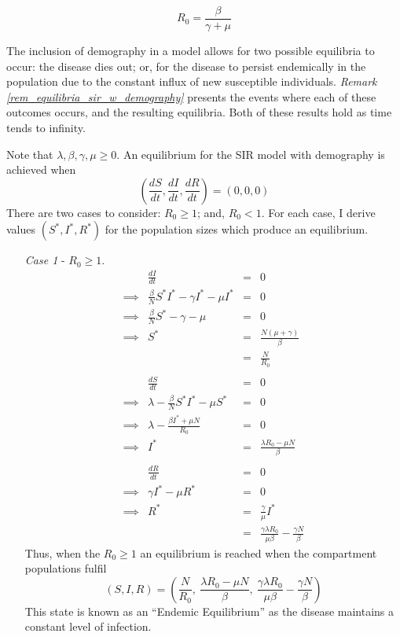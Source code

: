 \documentclass[11pt,a4paper]{article}
\theoremstyle{break}
\begin{document}
  \begin{equation}\label{eqn_r0_sir_w_demographics}
    R_0=\frac{\beta}{\gamma+\mu}
  \end{equation}

  \par The inclusion of demography in a model allows for two possible equilibria to occur: the disease dies out; or, for the disease to persist endemically in the population due to the constant influx of new susceptible individuals. \textit{Remark \ref{rem_equilibria_sir_w_demography}} presents the events where each of these outcomes occurs, and the resulting equilibria. Both of these results hold as time tends to infinity.

  \begin{box_remark}\label{rem_equilibria_sir_w_demography}
    Note that $\lambda,\beta,\gamma,\mu\geq0$. An equilibrium for the SIR model with demography is achieved when
    \[ \left(\frac{dS}{dt},\frac{dI}{dt},\frac{dR}{dt}\right)=(0,0,0) \]
    There are two cases to consider: $R_0\geq 1$; and, $R_0<1$. For each case, I derive values $(S^*,I^*,R^*)$ for the population sizes which produce an equilibrium.
    \begin{itemize}
      \item[\textit{Case 1}] - $R_0\geq1$.
      \[\begin{array}{rrcl}
        &\frac{dI}{dt}&=&0\\
        \implies&\frac{\beta}N S^*I^*-\gamma I^*-\mu I^*&=&0\\
        \implies&\frac{\beta}N S^*-\gamma-\mu&=&0\\
        \implies&S^*&=&\frac{N(\mu+\gamma)}\beta\\
        &&=&\frac{N}{R_0}\\
        \\
        &\frac{dS}{dt}&=&0\\
        \implies&\lambda-\frac\beta{N} S^*I^*-\mu S^*&=&0\\
        \implies&\lambda-\frac{\beta I^*+\mu N}{R_0}&=&0\\
        \implies&I^*&=&\frac{\lambda R_0-\mu N}\beta\\
        \\
        &\frac{dR}{dt}&=&0\\
        \implies&\gamma I^*-\mu R^*&=&0\\
        \implies&R^*&=&\frac\gamma\mu I^*\\
        &&=&\frac{\gamma\lambda R_0}{\mu\beta}-\frac{\gamma N}\beta
      \end{array}\]
      Thus, when the $R_0\geq1$ an equilibrium is reached when the compartment populations fulfil
      \[ (S,I,R)=\left(\frac{N}{R_0},\ \frac{\lambda R_0-\mu N}\beta,\ \frac{\gamma\lambda R_0}{\mu\beta}-\frac{\gamma N}\beta\right) \]
      This state is known as an ``Endemic Equilibrium'' as the disease maintains a constant level of infection.


\end{itemize}
\end{box_remark}
\end{document}
